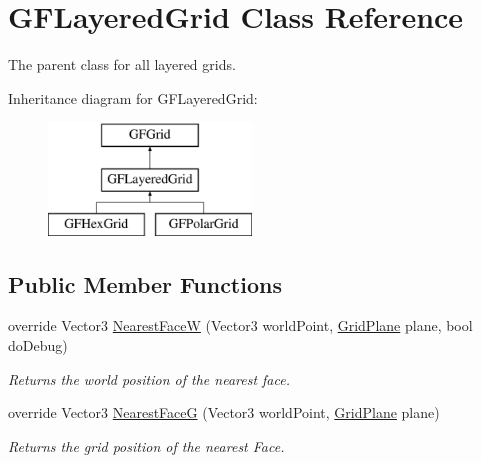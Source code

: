 \hypertarget{class_g_f_layered_grid}{\section{G\+F\+Layered\+Grid Class Reference}
\label{class_g_f_layered_grid}
}


The parent class for all layered grids. 


Inheritance diagram for G\+F\+Layered\+Grid\+:\begin{figure}[H]
\begin{center}
\leavevmode
\includegraphics[height=3.000000cm]{class_g_f_layered_grid}
\end{center}
\end{figure}
\subsection*{Public Member Functions}
\begin{DoxyCompactItemize}
\item 
override Vector3 \hyperlink{class_g_f_layered_grid_a0fad538e6ffb56209e76da00c357a3c9_a0fad538e6ffb56209e76da00c357a3c9}{Nearest\+Face\+W} (Vector3 world\+Point, \hyperlink{namespace_grid_framework_aa55de93079e09bd55c4cb660025820d5_aa55de93079e09bd55c4cb660025820d5}{Grid\+Plane} plane, bool do\+Debug)
\begin{DoxyCompactList}\small\item\em Returns the world position of the nearest face.\end{DoxyCompactList}\item 
override Vector3 \hyperlink{class_g_f_layered_grid_a5af848e6ee44af68a8c4748716925468_a5af848e6ee44af68a8c4748716925468}{Nearest\+Face\+G} (Vector3 world\+Point, \hyperlink{namespace_grid_framework_aa55de93079e09bd55c4cb660025820d5_aa55de93079e09bd55c4cb660025820d5}{Grid\+Plane} plane)
\begin{DoxyCompactList}\small\item\em Returns the grid position of the nearest Face.\end{DoxyCompactList}\end{DoxyCompactItemize}
